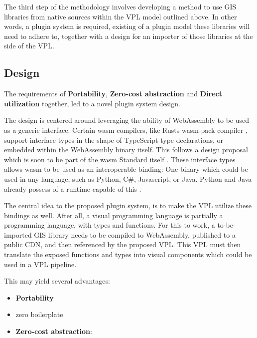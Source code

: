 The third step of the methodology involves developing a method to use GIS libraries from native sources within the VPL model outlined above. 
In other words, a plugin system is required, existing of a plugin model these libraries will need to adhere to, together with a design for an importer of those libraries at the side of the VPL. 

\subsection{Design}

The requirements of \textbf{Portability}, \textbf{Zero-cost abstraction} and \textbf{Direct utilization} together, led to a novel plugin system design. 

The design is centered around leveraging the ability of WebAssembly to be used as a generic interface. 
Certain \ac{wasm} compilers, like Rusts wasm-pack compiler \citep*{contributors_wasm-pack_2022}, support interface types in the shape of TypeScript type declarations, or embedded within the WebAssembly binary itself. 
This follows a design proposal which is soon to be part of the \ac{wasm} Standard itself \citep*{wagner_interface_2022}.
These interface types allows \ac{wasm} to be used as an interoperable binding: One binary which could be used in any language, such as Python, C\#, Javascript, or Java. 
Python and Java already possess of a runtime capable of this \citep*{clack_standardizing_2019}. 

The central idea to the proposed plugin system, is to make the VPL utilize these bindings as well. 
After all, a visual programming language is partially a programming language, with types and functions. 
For this to work, a to-be-imported GIS library needs to be compiled to WebAssembly, published to a public \ac{CDN}, and then referenced by the proposed VPL. 
This VPL must then translate the exposed functions and types into visual components which could be used in a VPL pipeline. 

This may yield several advantages: 
\begin{itemize}
  \item \textbf{Portability}
  \item zero boilerplate 
  \item \textbf{Zero-cost abstraction}: 
\end{itemize}


